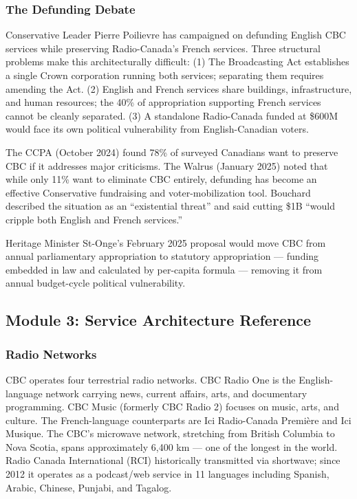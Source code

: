 \documentclass[11pt,letterpaper]{article}
\begin{document}
\subsubsection{The Defunding Debate}

Conservative Leader Pierre Poilievre has campaigned on defunding English CBC services while preserving Radio-Canada's French services. Three structural problems make this architecturally difficult: (1) The Broadcasting Act establishes a single Crown corporation running both services; separating them requires amending the Act. (2) English and French services share buildings, infrastructure, and human resources; the 40\% of appropriation supporting French services cannot be cleanly separated. (3) A standalone Radio-Canada funded at \$600M would face its own political vulnerability from English-Canadian voters.

The CCPA (October 2024) found 78\% of surveyed Canadians want to preserve CBC if it addresses major criticisms. The Walrus (January 2025) noted that while only 11\% want to eliminate CBC entirely, defunding has become an effective Conservative fundraising and voter-mobilization tool. Bouchard described the situation as an ``existential threat'' and said cutting \$1B ``would cripple both English and French services.''

Heritage Minister St-Onge's February 2025 proposal would move CBC from annual parliamentary appropriation to statutory appropriation --- funding embedded in law and calculated by per-capita formula --- removing it from annual budget-cycle political vulnerability.

\subsection{Module 3: Service Architecture Reference}

\subsubsection{Radio Networks}

CBC operates four terrestrial radio networks. CBC Radio One is the English-language network carrying news, current affairs, arts, and documentary programming. CBC Music (formerly CBC Radio 2) focuses on music, arts, and culture. The French-language counterparts are Ici Radio-Canada Premi\`{e}re and Ici Musique. The CBC's microwave network, stretching from British Columbia to Nova Scotia, spans approximately 6,400 km --- one of the longest in the world. Radio Canada International (RCI) historically transmitted via shortwave; since 2012 it operates as a podcast/web service in 11 languages including Spanish, Arabic, Chinese, Punjabi, and Tagalog.
\end{document}
